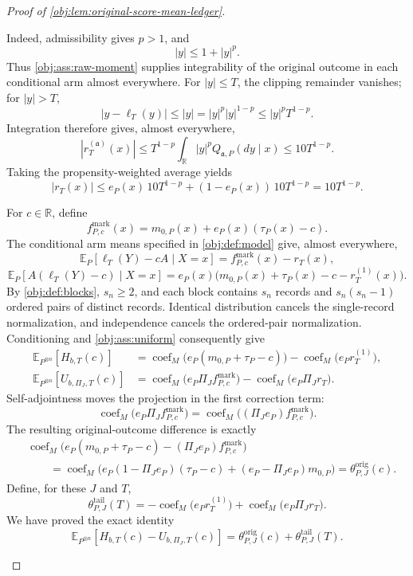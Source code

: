 \begin{proof}[Proof of \cref{obj:lem:original-score-mean-ledger}]
\begin{enumerate}
Indeed, admissibility gives \(p>1\), and
\[
|y|\le1+|y|^p.
\]
Thus \cref{obj:ass:raw-moment} supplies integrability of the original outcome in each conditional arm almost everywhere. For \(|y|\le T\), the clipping remainder vanishes; for \(|y|>T\),
\[
|y-\ell_T(y)|
\le |y|
=|y|^p|y|^{1-p}
\le |y|^pT^{1-p}.
\]
Integration therefore gives, almost everywhere,
\[
|r_T^{(\mathfrak a)}(x)|
\le
T^{1-p}\int_{\mathbb R}|y|^pQ_{\mathfrak a,P}(dy\mid x)
\le10T^{1-p}.
\]
Taking the propensity-weighted average yields
\[
|r_T(x)|
\le e_P(x)\,10T^{1-p}
+(1-e_P(x))\,10T^{1-p}
=10T^{1-p}.
\]

For \(c\in\mathbb R\), define
\[
f^{\mathrm{mark}}_{P,c}(x)
=
m_{0,P}(x)+e_P(x)(\tau_P(x)-c).
\]
The conditional arm means specified in \cref{obj:def:model} give, almost everywhere,
\[
\mathbb E_P[\ell_T(Y)-cA\mid X=x]
=
f^{\mathrm{mark}}_{P,c}(x)-r_T(x),
\]
\[
\mathbb E_P[A(\ell_T(Y)-c)\mid X=x]
=
e_P(x)\bigl(m_{0,P}(x)+\tau_P(x)-c-r_T^{(1)}(x)\bigr).
\]
By \cref{obj:def:blocks}, \(s_n\ge2\), and each block contains \(s_n\) records and \(s_n(s_n-1)\) ordered pairs of distinct records. Identical distribution cancels the single-record normalization, and independence cancels the ordered-pair normalization. Conditioning and
\cref{obj:ass:uniform} consequently give
\[
\begin{aligned}
\mathbb E_{P^{\otimes n}}[H_{b,T}(c)]
&=
\operatorname{coef}_M\bigl(e_P(m_{0,P}+\tau_P-c)\bigr)
-\operatorname{coef}_M\bigl(e_Pr_T^{(1)}\bigr),\\
\mathbb E_{P^{\otimes n}}[U_{b,\Pi_J,T}(c)]
&=
\operatorname{coef}_M\bigl(e_P\Pi_Jf^{\mathrm{mark}}_{P,c}\bigr)
-\operatorname{coef}_M\bigl(e_P\Pi_Jr_T\bigr).
\end{aligned}
\]
Self-adjointness moves the projection in the first correction term:
\[
\operatorname{coef}_M\bigl(e_P\Pi_Jf^{\mathrm{mark}}_{P,c}\bigr)
=
\operatorname{coef}_M\bigl((\Pi_Je_P)f^{\mathrm{mark}}_{P,c}\bigr).
\]
The resulting original-outcome difference is exactly
\[
\begin{aligned}
&\operatorname{coef}_M\bigl(
e_P(m_{0,P}+\tau_P-c)-(\Pi_Je_P)f^{\mathrm{mark}}_{P,c}
\bigr)\\
&\hspace{2em}
=
\operatorname{coef}_M\bigl(
e_P(1-\Pi_Je_P)(\tau_P-c)+(e_P-\Pi_Je_P)m_{0,P}
\bigr)
=
\theta^{\mathrm{orig}}_{P,J}(c).
\end{aligned}
\]
Define, for these \(J\) and \(T\),
\[
\theta^{\mathrm{tail}}_{P,J}(T)
=
-\operatorname{coef}_M\bigl(e_Pr_T^{(1)}\bigr)
+\operatorname{coef}_M\bigl(e_P\Pi_Jr_T\bigr).
\]
We have proved the exact identity
\[
\mathbb E_{P^{\otimes n}}
[H_{b,T}(c)-U_{b,\Pi_J,T}(c)]
=
\theta^{\mathrm{orig}}_{P,J}(c)
+\theta^{\mathrm{tail}}_{P,J}(T).
\]


\end{enumerate}
\end{proof}
